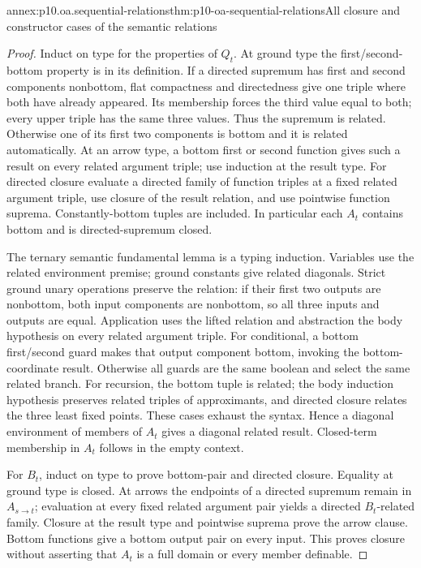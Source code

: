\begin{annexitem}{annex:p10.oa.sequential-relations}{thm:p10-oa-sequential-relations}{All closure and constructor cases of the semantic relations}
\begin{proof}
Induct on type for the properties of \(Q_t\). At ground type the
first/second-bottom property is in its definition. If a directed supremum
has first and second components nonbottom, flat compactness and
directedness give one triple where both have already appeared. Its
membership forces the third value equal to both; every upper triple
has the same three values. Thus the supremum is related. Otherwise one
of its first two components is bottom and it is related automatically.
At an arrow type, a bottom first or second function gives such a result
on every related argument triple; use induction at the result type.
For directed closure evaluate a directed family of function triples at
a fixed related argument triple, use closure of the result relation,
and use pointwise function suprema. Constantly-bottom tuples are included.
In particular each \(A_t\) contains bottom and is directed-supremum closed.

The ternary semantic fundamental lemma is a typing induction. Variables
use the related environment premise; ground constants give related
diagonals. Strict ground unary operations preserve the relation: if
their first two outputs are nonbottom, both input components are
nonbottom, so all three inputs and outputs are equal. Application uses
the lifted relation and abstraction the body hypothesis on every related
argument triple. For conditional, a bottom first/second guard makes that
output component bottom, invoking the bottom-coordinate result. Otherwise
all guards are the same boolean and select the same related branch.
For recursion, the bottom tuple is related; the body induction hypothesis
preserves related triples of approximants, and directed closure relates
the three least fixed points. These cases exhaust the syntax. Hence a
diagonal environment of members of \(A_t\) gives a diagonal related
result. Closed-term membership in \(A_t\) follows in the empty context.

For \(B_t\), induct on type to prove bottom-pair and directed closure.
Equality at ground type is closed. At arrows the endpoints of a directed
supremum remain in \(A_{s\to t}\); evaluation at every fixed related
argument pair yields a directed \(B_t\)-related family. Closure at
the result type and pointwise suprema prove the arrow clause. Bottom
functions give a bottom output pair on every input. This proves closure
without asserting that \(A_t\) is a full domain or every member definable.


\end{proof}
\end{annexitem}
